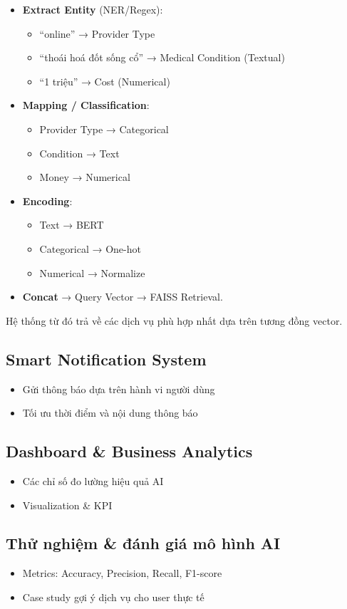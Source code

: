 \begin{itemize}
    \item \textbf{Extract Entity} (NER/Regex):
    \begin{itemize}
        \item ``online'' → Provider Type
        \item ``thoái hoá đốt sống cổ'' → Medical Condition (Textual)
        \item ``1 triệu'' → Cost (Numerical)
    \end{itemize}

    \item \textbf{Mapping / Classification}:
    \begin{itemize}
        \item Provider Type → Categorical
        \item Condition → Text
        \item Money → Numerical
    \end{itemize}

    \item \textbf{Encoding}:
    \begin{itemize}
        \item Text → BERT
        \item Categorical → One-hot
        \item Numerical → Normalize
    \end{itemize}

    \item \textbf{Concat} → Query Vector → FAISS Retrieval.
\end{itemize}

Hệ thống từ đó trả về các dịch vụ phù hợp nhất dựa trên tương đồng vector.





\subsection{Smart Notification System}
\begin{itemize}
    \item Gửi thông báo dựa trên hành vi người dùng
    \item Tối ưu thời điểm và nội dung thông báo
\end{itemize}
\subsection{Dashboard \& Business Analytics}
\begin{itemize}
    \item Các chỉ số đo lường hiệu quả AI
    \item Visualization \& KPI
\end{itemize}
\subsection{Thử nghiệm \& đánh giá mô hình AI}
\begin{itemize}
    \item Metrics: Accuracy, Precision, Recall, F1-score
    \item Case study gợi ý dịch vụ cho user thực tế
\end{itemize}
